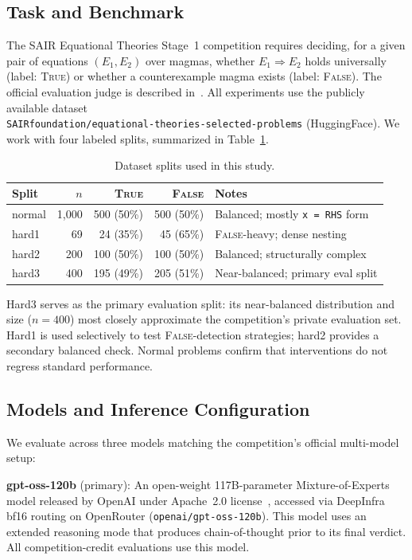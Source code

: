 \documentclass[11pt]{article}
\begin{document}
\subsection{Task and Benchmark}

The SAIR Equational Theories Stage~1 competition requires deciding,
for a given pair of equations $(E_1, E_2)$ over magmas, whether
$E_1 \Rightarrow E_2$ holds universally (label: \textsc{True}) or
whether a counterexample magma exists (label: \textsc{False}). The
official evaluation judge is described in~\citet{sair2026judge}. All
experiments use the publicly available dataset\\
\texttt{SAIRfoundation/equational-theories-selected-problems}
(HuggingFace). We work with four labeled splits, summarized in
Table~\ref{tab:splits}.

\begin{table}[h]
\centering
\caption{Dataset splits used in this study.}
\label{tab:splits}
\begin{tabular}{lrrrl}
\toprule
Split & $n$ & \textsc{True} & \textsc{False} & Notes \\
\midrule
normal & 1{,}000 & 500 (50\%) & 500 (50\%) & Balanced; mostly \texttt{x = RHS} form \\
hard1  & 69      & 24 (35\%)  & 45 (65\%)  & \textsc{False}-heavy; dense nesting \\
hard2  & 200     & 100 (50\%) & 100 (50\%) & Balanced; structurally complex \\
hard3  & 400     & 195 (49\%) & 205 (51\%) & Near-balanced; primary eval split \\
\bottomrule
\end{tabular}
\end{table}

Hard3 serves as the primary evaluation split: its near-balanced
distribution and size ($n=400$) most closely approximate the
competition's private evaluation set. Hard1 is used selectively to
test \textsc{False}-detection strategies; hard2 provides a secondary
balanced check. Normal problems confirm that interventions do not
regress standard performance.

\subsection{Models and Inference Configuration}

We evaluate across three models matching the competition's official
multi-model setup:

\textbf{gpt-oss-120b} (primary): An open-weight 117B-parameter
Mixture-of-Experts model released by OpenAI under Apache~2.0
license~\citep{openai2025gptoss}, accessed via DeepInfra bf16 routing
on OpenRouter (\texttt{openai/gpt-oss-120b}). This model uses an
extended reasoning mode that produces chain-of-thought prior to its
final verdict. All competition-credit evaluations use this model.
\end{document}
